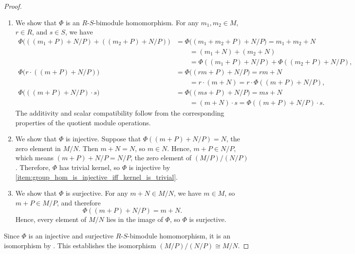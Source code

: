 \begin{proof}
\begin{enumerate}
        \item We show that $\Phi$ is an $R$-$S$-bimodule homomorphism. For any $m_1, m_2 \in M$, $r \in R$, and $s \in S$, we have
        \begin{align*}
        \Phi\bigl(((m_1 + P) + N/P) + ((m_2 + P) + N/P)\bigr) &= \Phi\bigl((m_1 + m_2 + P) + N/P\bigr) = m_1 + m_2 + N \\
        &\qquad = (m_1 + N) + (m_2 + N) \\
        &\qquad = \Phi((m_1 + P) + N/P) + \Phi((m_2 + P) + N/P), \\
        \Phi\bigl(r \cdot ((m + P) + N/P)\bigr) &= \Phi\bigl((r m + P) + N/P\bigr) = r m + N \\
        &\qquad = r \cdot (m + N) = r \cdot \Phi((m + P) + N/P), \\
        \Phi\bigl(((m + P) + N/P) \cdot s\bigr) &= \Phi\bigl((m s + P) + N/P\bigr) = m s + N \\
        &\qquad = (m + N) \cdot s = \Phi((m + P) + N/P) \cdot s.
        \end{align*}
        The additivity and scalar compatibility follow from the corresponding properties of the quotient module operations.

        \item We show that $\Phi$ is injective. Suppose that $\Phi((m + P) + N/P) = N$, the zero element in $M/N$. Then $m + N = N$, so $m \in N$. Hence, $m + P \in N/P$, which means $(m + P) + N/P = N/P$, the zero element of $(M/P)/(N/P)$. Therefore, $\Phi$ has trivial kernel, so $\Phi$ is injective by \eqref{item:group_hom_is_injective_iff_kernel_is_trivial}.

        \item We show that $\Phi$ is surjective. For any $m + N \in M/N$, we have $m \in M$, so $m + P \in M/P$, and therefore
        $$\Phi((m + P) + N/P) = m + N.$$
        Hence, every element of $M/N$ lies in the image of $\Phi$, so $\Phi$ is surjective.
    \end{enumerate}

    Since $\Phi$ is an injective and surjective $R$-$S$-bimodule homomorphism, it is an isomorphism by . This establishes the isomorphism $(M/P)/(N/P) \cong M/N$.
\end{proof}